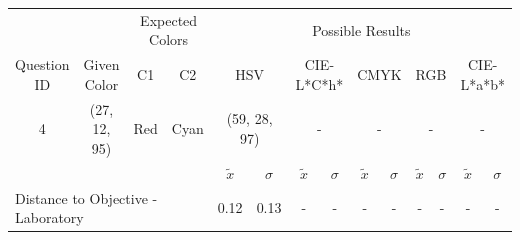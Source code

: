 \begin{table}[H]
  \resizebox{\textwidth}{!} {
  \begin{tabular}{lccccccccccccc}
    \hline
    \multicolumn{1}{c}{}                              &                                      & \multicolumn{2}{c}{Expected Colors}                   & \multicolumn{10}{c}{Possible Results}                                                                                                                                                                                                                                                                                        \\ \cline{3-14}
    \multicolumn{1}{c}{\multirow{-2}{*}{Question ID}} & \multirow{-2}{*}{Given Color}        & C1                       & C2                         & \multicolumn{2}{c}{HSV}                                        & \multicolumn{2}{c}{CIE-L*C*h*}                                 & \multicolumn{2}{c}{CMYK}                                       & \multicolumn{2}{c}{RGB}                                        & \multicolumn{2}{c}{CIE-L*a*b*}                                 \\ \hline
    \multicolumn{1}{c}{4}                             & \cellcolor[HTML]{7F00FF}(27, 12, 95) & \multicolumn{1}{c|}{Red} & \multicolumn{1}{c|}{Cyan}  & \multicolumn{2}{c|}{\cellcolor[HTML]{FF00FF}(59, 28, 97)}      & \multicolumn{2}{c|}{-}       & \multicolumn{2}{c|}{-}        & \multicolumn{2}{c|}{-}       & \multicolumn{2}{c|}{-}       \\ \hline
                                                      & \multicolumn{1}{l}{}                 & \multicolumn{1}{l}{}     & \multicolumn{1}{l}{}       & \multicolumn{1}{c}{$\tilde{x}$} & \multicolumn{1}{c}{$\sigma$} & \multicolumn{1}{c}{$\tilde{x}$} & \multicolumn{1}{c}{$\sigma$} & \multicolumn{1}{c}{$\tilde{x}$} & \multicolumn{1}{c}{$\sigma$} & \multicolumn{1}{c}{$\tilde{x}$} & \multicolumn{1}{c}{$\sigma$} & \multicolumn{1}{c}{$\tilde{x}$} & \multicolumn{1}{c}{$\sigma$} \\ \hline
    \multicolumn{4}{l}{Distance to Objective - Laboratory}                                                                                           & \multicolumn{1}{|c}{0.12}       & \multicolumn{1}{c|}{0.13}    & \multicolumn{1}{|c}{-}       & \multicolumn{1}{c|}{-}    & \multicolumn{1}{|c}{-}         & \multicolumn{1}{c|}{-}    & \multicolumn{1}{|c}{-}       & \multicolumn{1}{c|}{-}    & \multicolumn{1}{|c}{-}       & \multicolumn{1}{c|}{-}    \\

\end{tabular}}
\end{table}
